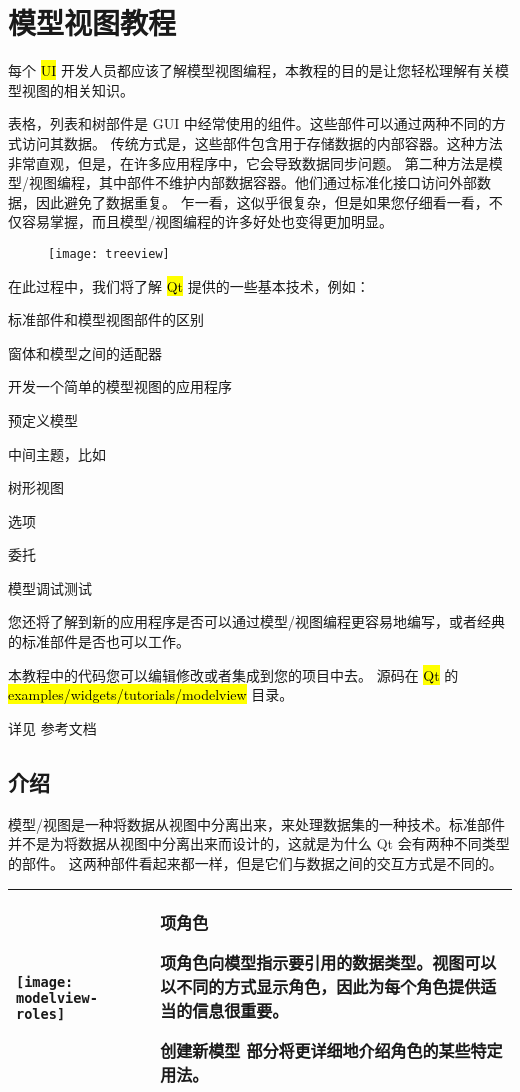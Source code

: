 \chapter{模型视图教程}

每个 \hl{UI} 开发人员都应该了解模型视图编程，本教程的目的是让您轻松理解有关模型视图的相关知识。

表格，列表和树部件是 GUI 中经常使用的组件。这些部件可以通过两种不同的方式访问其数据。
传统方式是，这些部件包含用于存储数据的内部容器。这种方法非常直观，但是，在许多应用程序中，它会导致数据同步问题。
第二种方法是模型/视图编程，其中部件不维护内部数据容器。他们通过标准化接口访问外部数据，因此避免了数据重复。
乍一看，这似乎很复杂，但是如果您仔细看一看，不仅容易掌握，而且模型/视图编程的许多好处也变得更加明显。

\begin{figure}[hbt!]  
\texttt{[image: treeview]}
\end{figure}

在此过程中，我们将了解 \hl{Qt} 提供的一些基本技术，例如：

\begin{compactitem}
\item 标准部件和模型视图部件的区别
\item 窗体和模型之间的适配器
\item 开发一个简单的模型视图的应用程序
\item 预定义模型

\end{compactitem}

中间主题，比如

\begin{compactitem}
\item 树形视图
\item 选项
\item 委托
\item 模型调试测试
\end{compactitem}

您还将了解到新的应用程序是否可以通过模型/视图编程更容易地编写，或者经典的标准部件是否也可以工作。

本教程中的代码您可以编辑修改或者集成到您的项目中去。 源码在 \hl{Qt} 的 \hl{examples/widgets/tutorials/modelview} 目录。

详见 参考文档

\section{介绍}

模型/视图是一种将数据从视图中分离出来，来处理数据集的一种技术。标准部件并不是为将数据从视图中分离出来而设计的，这就是为什么 Qt 会有两种不同类型的部件。
这两种部件看起来都一样，但是它们与数据之间的交互方式是不同的。

\begin{tabular}{|l|m{25em}|}
	\hline
		\texttt{[image: modelview-roles]}
	  & 
	项角色
	
	项角色向模型指示要引用的数据类型。视图可以以不同的方式显示角色，因此为每个角色提供适当的信息很重要。
	
	创建新模型 部分将更详细地介绍角色的某些特定用法。\\
	\hline	
	\end{tabular}